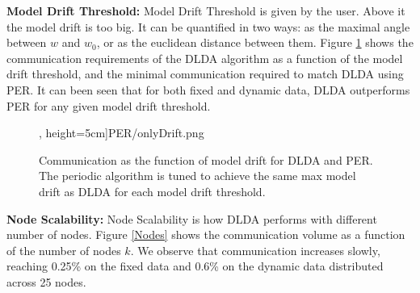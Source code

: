 \documentclass{vldb}
\begin{document}
\noindent\textbf{Model Drift Threshold:} Model Drift Threshold is given by the user. Above it the model drift is too big. It can be quantified in two ways: as the maximal angle between $w$ and $w_0$, or as the euclidean distance between them. 
Figure \ref{PERvsDLDAoverError} shows the communication requirements of the DLDA algorithm as a function of the model drift threshold, and the minimal communication required to match DLDA using PER.	
It can been seen that for both fixed and dynamic data, DLDA outperforms PER for
any given model drift threshold.
 \begin{figure}[ht]
	\centering
	, height=5cm]{PER/onlyDrift.png}
	\caption{Communication as the function of model drift for DLDA and PER. The
	periodic algorithm is tuned to achieve the same max model drift as DLDA
	for each model drift threshold.}
	\label{PERvsDLDAoverError}
	\end{figure}

	
\noindent\textbf{Node Scalability:}
Node Scalability is how DLDA performs with different number of nodes.
Figure \ref{Nodes} shows the communication volume as a function of the number of nodes $k$.
We observe that communication increases slowly, reaching 0.25\% on the fixed
data and 0.6\% on the dynamic data distributed across 25 nodes.
\end{document}
